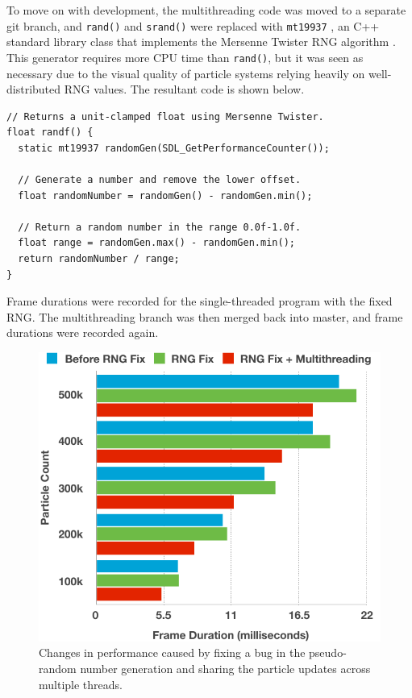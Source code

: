 \documentclass[11pt, a4paper, twocolumn]{article}
\begin{document}
To move on with development, the multithreading code was moved to a separate git branch, and \verb|rand()| and \verb|srand()| were replaced with \verb|mt19937| \citep{mt19937Docs}, an C++ standard library class that implements the Mersenne Twister RNG algorithm \citep{Matsumoto1998}. This generator requires more CPU time than \verb|rand()|, but it was seen as necessary due to the visual quality of particle systems relying heavily on well-distributed RNG values. The resultant code is shown below.

\begin{verbatim}
// Returns a unit-clamped float using Mersenne Twister.
float randf() {
  static mt19937 randomGen(SDL_GetPerformanceCounter());
  
  // Generate a number and remove the lower offset.
  float randomNumber = randomGen() - randomGen.min();
  
  // Return a random number in the range 0.0f-1.0f.
  float range = randomGen.max() - randomGen.min();
  return randomNumber / range;
}
\end{verbatim}

Frame durations were recorded for the single-threaded program with the fixed RNG. The multithreading branch was then merged back into master, and frame durations were recorded again.

\begin{figure}[h]
\includegraphics[width=\linewidth]{initial-rng-multithread}
\caption{Changes in performance caused by fixing a bug in the pseudo-random number generation and sharing the particle updates across multiple threads.}
\label{fig:initial-rng-multithread}
\end{figure}
\end{document}
